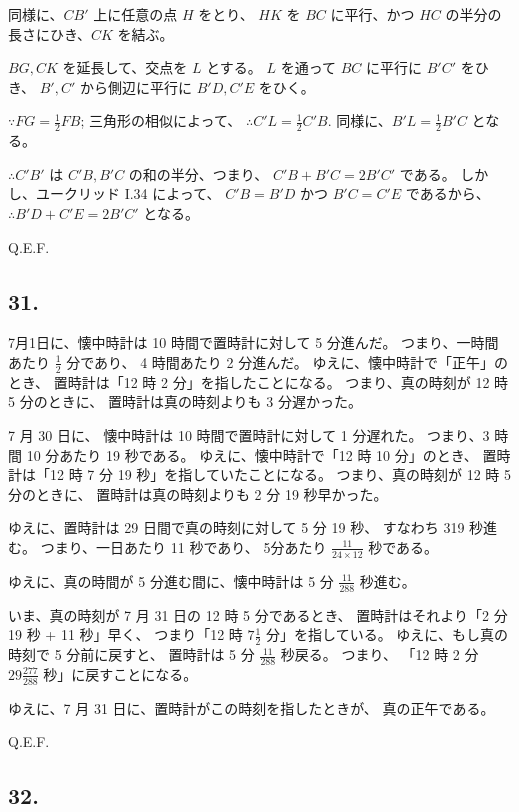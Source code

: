 同様に、$CB'$ 上に任意の点 $H$ をとり、
$HK$ を $BC$ に平行、かつ $HC$ の半分の長さにひき、$CK$ を結ぶ。

$BG, CK$ を延長して、交点を $L$ とする。
$L$ を通って $BC$ に平行に $B'C'$ をひき、
$B', C'$ から側辺に平行に $B'D, C'E$ をひく。

$\because FG = \frac{1}{2} FB$;
三角形の相似によって、
$\therefore C'L = \frac{1}{2} C'B$.
同様に、$B'L = \frac{1}{2} B'C$ となる。

$\therefore C'B'$ は $C'B, B'C$ の和の半分、つまり、
$C'B + B'C = 2 B'C'$ である。
しかし、ユークリッド I.34 によって、
$C'B = B'D$ かつ $B'C = C'E$ であるから、
$\therefore B'D + C'E = 2 B'C'$ となる。

Q.E.F.

\subsection*{31.}

7月1日に、懐中時計は 10 時間で置時計に対して 5 分進んだ。
つまり、一時間あたり $\frac{1}{2}$ 分であり、
4 時間あたり 2 分進んだ。
ゆえに、懐中時計で「正午」のとき、
置時計は「12 時 2 分」を指したことになる。
つまり、真の時刻が 12 時 5 分のときに、
置時計は真の時刻よりも 3 分遅かった。

7 月 30 日に、
懐中時計は 10 時間で置時計に対して 1 分遅れた。
つまり、3 時間 10 分あたり 19 秒である。
ゆえに、懐中時計で「12 時 10 分」のとき、
置時計は「12 時 7 分 19 秒」を指していたことになる。
つまり、真の時刻が 12 時 5 分のときに、
置時計は真の時刻よりも 2 分 19 秒早かった。

ゆえに、置時計は 29 日間で真の時刻に対して 5 分 19 秒、
すなわち 319 秒進む。
つまり、一日あたり 11 秒であり、
5分あたり $\frac{11}{24 \times 12}$ 秒である。

ゆえに、真の時間が 5 分進む間に、懐中時計は 5 分 $\frac{11}{288}$ 秒進む。

いま、真の時刻が 7 月 31 日の 12 時 5 分であるとき、
置時計はそれより「2 分 19 秒 + 11 秒」早く、
つまり「12 時 $7 \frac{1}{2}$ 分」を指している。
ゆえに、もし真の時刻で 5 分前に戻すと、
置時計は 5 分 $\frac{11}{288}$ 秒戻る。
つまり、
「12 時 2 分 $29 \frac{277}{288}$ 秒」に戻すことになる。

ゆえに、7 月 31 日に、置時計がこの時刻を指したときが、
真の正午である。

Q.E.F.

\subsection*{32.}

